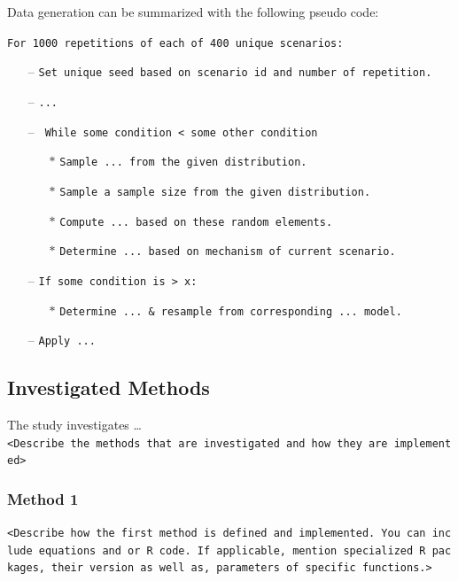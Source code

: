 \documentclass[10,a4paperpaper,]{article}
\begin{document}
\begin{minipage}{\linewidth}
Data generation can be summarized with the following pseudo code:

\texttt{For 1000 repetitions of each of 400 unique scenarios:}
\begin{itemize}[leftmargin=*] 
    \item[--] \texttt{Set unique seed based on scenario id and number of repetition.}
    \item[--] \texttt{...}
    \item[--] \texttt{ While some condition < some other condition}
    \begin{itemize}
      \item[$\ast$] \texttt{Sample ... from the given distribution.}
      \item[$\ast$] \texttt{Sample a sample size from the given distribution.}
      \item[$\ast$] \texttt{Compute ... based on these random elements.}
      \item[$\ast$] \texttt{Determine ... based on mechanism of current scenario.}
    \end{itemize}
    \item[--] \texttt{If some condition is > x:}
    \begin{itemize}
      \item[$\ast$] \texttt{Determine ... \& resample from corresponding ... model.}
    \end{itemize}
    \item[--] \texttt{Apply ...}
\end{itemize}
\end{minipage}
\newpage

\FloatBarrier 

\subsection{Investigated Methods}

The study investigates \ldots{}
\texttt{\textless{}Describe\ the\ methods\ that\ are\ investigated\ and\ how\ they\ are\ implemented\textgreater{}}

\subsubsection{Method 1}

\texttt{\textless{}Describe\ how\ the\ first\ method\ is\ defined\ and\ implemented.\ You\ can\ include\ equations\ and\ or\ R\ code.\ If\ applicable,\ mention\ specialized\ R\ packages,\ their\ version\ as\ well\ as,\ parameters\ of\ specific\ functions.\textgreater{}}
\end{document}
